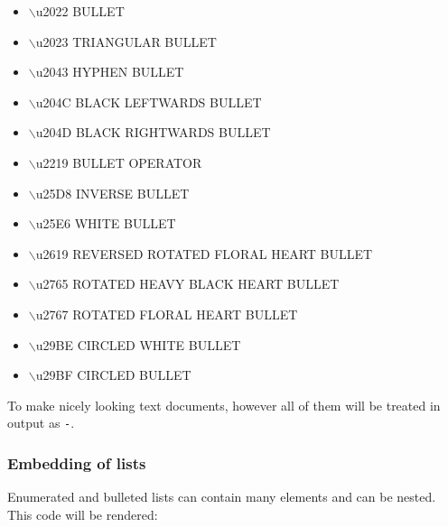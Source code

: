 \documentclass[12pt]{article}
\begin{document}
\begin{itemize}
\item
$\backslash$u2022 BULLET

\item
$\backslash$u2023 TRIANGULAR BULLET

\item
$\backslash$u2043 HYPHEN BULLET

\item
$\backslash$u204C BLACK LEFTWARDS BULLET

\item
$\backslash$u204D BLACK RIGHTWARDS BULLET

\item
$\backslash$u2219 BULLET OPERATOR

\item
$\backslash$u25D8 INVERSE BULLET

\item
$\backslash$u25E6 WHITE BULLET

\item
$\backslash$u2619 REVERSED ROTATED FLORAL HEART BULLET

\item
$\backslash$u2765 ROTATED HEAVY BLACK HEART BULLET

\item
$\backslash$u2767 ROTATED FLORAL HEART BULLET

\item
$\backslash$u29BE CIRCLED WHITE BULLET

\item
$\backslash$u29BF CIRCLED BULLET
\end{itemize}

To make nicely looking text documents, however all of them will be treated in
output as \texttt{-}.

\hypertarget{lembedding-of-lists}{}
\subsubsection{Embedding of lists}

Enumerated and bulleted lists can contain many elements and can be
nested. This code will be rendered:
\end{document}
